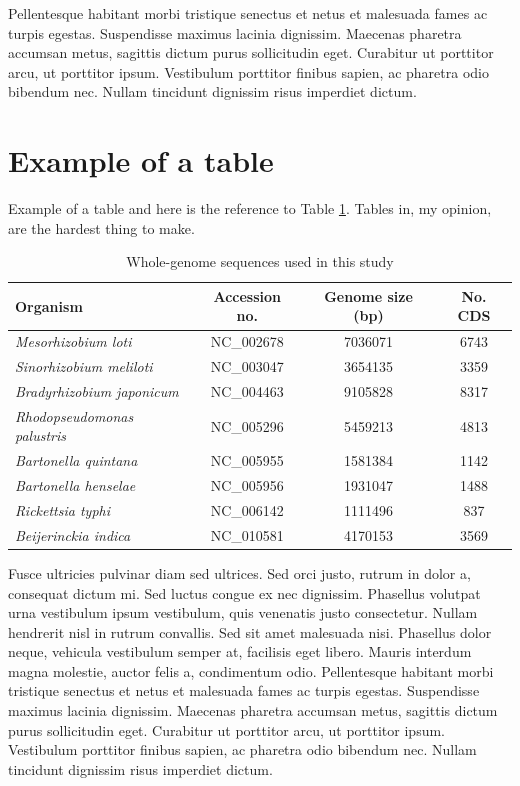 Pellentesque habitant morbi tristique senectus et netus et malesuada fames ac turpis egestas. Suspendisse maximus lacinia dignissim. Maecenas pharetra accumsan metus, sagittis dictum purus sollicitudin eget. Curabitur ut porttitor arcu, ut porttitor ipsum. Vestibulum porttitor finibus sapien, ac pharetra odio bibendum nec. Nullam tincidunt dignissim risus imperdiet dictum.
\section{Example of a table}
Example of a table and here is the reference to Table \ref{table_genomes}. Tables in, my opinion, are the hardest thing to make.

\begin{table}
\begin{center}
\begin{tabular}{|l|c|c|c|}
\hline
{\sc Organism}  &  {\sc Accession no.}  & {\sc Genome size} (bp)  & {\sc No. CDS} \\
\hline
{\it Mesorhizobium loti}          & NC\_002678 & 7036071 & 6743 \\
\hline
{\it Sinorhizobium meliloti}      & NC\_003047 & 3654135 & 3359 \\
\hline
{\it Bradyrhizobium japonicum}    & NC\_004463 & 9105828 & 8317 \\
\hline
{\it Rhodopseudomonas palustris}  & NC\_005296 & 5459213 & 4813 \\
\hline
{\it Bartonella quintana}         & NC\_005955 & 1581384 & 1142 \\
\hline
{\it Bartonella henselae}         & NC\_005956 & 1931047 & 1488 \\
\hline
{\it Rickettsia typhi}            & NC\_006142 & 1111496 & 837 \\
\hline
{\it Beijerinckia indica}         & NC\_010581 & 4170153 & 3569 \\
\hline
\end{tabular}
\end{center}
\caption{Whole-genome sequences used in this study}
\label{table_genomes}
\end{table}

Fusce ultricies pulvinar diam sed ultrices. Sed orci justo, rutrum in dolor a, consequat dictum mi. Sed luctus congue ex nec dignissim. Phasellus volutpat urna vestibulum ipsum vestibulum, quis venenatis justo consectetur. Nullam hendrerit nisl in rutrum convallis. Sed sit amet malesuada nisi. Phasellus dolor neque, vehicula vestibulum semper at, facilisis eget libero. Mauris interdum magna molestie, auctor felis a, condimentum odio. Pellentesque habitant morbi tristique senectus et netus et malesuada fames ac turpis egestas. Suspendisse maximus lacinia dignissim. Maecenas pharetra accumsan metus, sagittis dictum purus sollicitudin eget. Curabitur ut porttitor arcu, ut porttitor ipsum. Vestibulum porttitor finibus sapien, ac pharetra odio bibendum nec. Nullam tincidunt dignissim risus imperdiet dictum.

